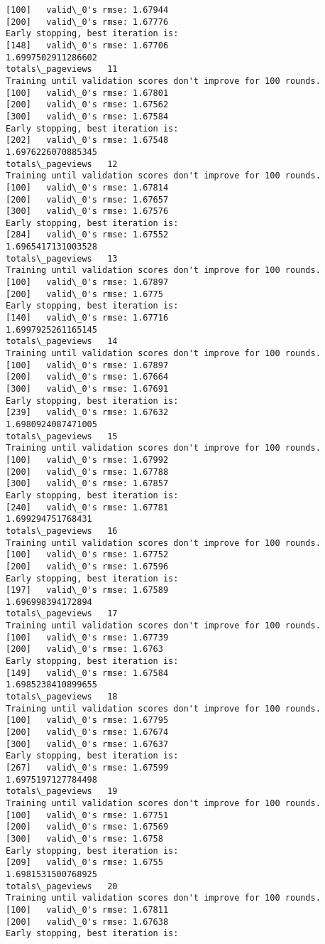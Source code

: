 \documentclass[11pt]{article}
\begin{document}
\begin{Verbatim}[commandchars=\\\{\}]
[100]	valid\_0's rmse: 1.67944
[200]	valid\_0's rmse: 1.67776
Early stopping, best iteration is:
[148]	valid\_0's rmse: 1.67706
1.6997502911286602
totals\_pageviews   11
Training until validation scores don't improve for 100 rounds.
[100]	valid\_0's rmse: 1.67801
[200]	valid\_0's rmse: 1.67562
[300]	valid\_0's rmse: 1.67584
Early stopping, best iteration is:
[202]	valid\_0's rmse: 1.67548
1.6976226070885345
totals\_pageviews   12
Training until validation scores don't improve for 100 rounds.
[100]	valid\_0's rmse: 1.67814
[200]	valid\_0's rmse: 1.67657
[300]	valid\_0's rmse: 1.67576
Early stopping, best iteration is:
[284]	valid\_0's rmse: 1.67552
1.6965417131003528
totals\_pageviews   13
Training until validation scores don't improve for 100 rounds.
[100]	valid\_0's rmse: 1.67897
[200]	valid\_0's rmse: 1.6775
Early stopping, best iteration is:
[140]	valid\_0's rmse: 1.67716
1.6997925261165145
totals\_pageviews   14
Training until validation scores don't improve for 100 rounds.
[100]	valid\_0's rmse: 1.67897
[200]	valid\_0's rmse: 1.67664
[300]	valid\_0's rmse: 1.67691
Early stopping, best iteration is:
[239]	valid\_0's rmse: 1.67632
1.6980924087471005
totals\_pageviews   15
Training until validation scores don't improve for 100 rounds.
[100]	valid\_0's rmse: 1.67992
[200]	valid\_0's rmse: 1.67788
[300]	valid\_0's rmse: 1.67857
Early stopping, best iteration is:
[240]	valid\_0's rmse: 1.67781
1.699294751768431
totals\_pageviews   16
Training until validation scores don't improve for 100 rounds.
[100]	valid\_0's rmse: 1.67752
[200]	valid\_0's rmse: 1.67596
Early stopping, best iteration is:
[197]	valid\_0's rmse: 1.67589
1.696998394172894
totals\_pageviews   17
Training until validation scores don't improve for 100 rounds.
[100]	valid\_0's rmse: 1.67739
[200]	valid\_0's rmse: 1.6763
Early stopping, best iteration is:
[149]	valid\_0's rmse: 1.67584
1.6985238410899655
totals\_pageviews   18
Training until validation scores don't improve for 100 rounds.
[100]	valid\_0's rmse: 1.67795
[200]	valid\_0's rmse: 1.67674
[300]	valid\_0's rmse: 1.67637
Early stopping, best iteration is:
[267]	valid\_0's rmse: 1.67599
1.6975197127784498
totals\_pageviews   19
Training until validation scores don't improve for 100 rounds.
[100]	valid\_0's rmse: 1.67751
[200]	valid\_0's rmse: 1.67569
[300]	valid\_0's rmse: 1.6758
Early stopping, best iteration is:
[209]	valid\_0's rmse: 1.6755
1.6981531500768925
totals\_pageviews   20
Training until validation scores don't improve for 100 rounds.
[100]	valid\_0's rmse: 1.67811
[200]	valid\_0's rmse: 1.67638
Early stopping, best iteration is:

\end{Verbatim}
\end{document}
